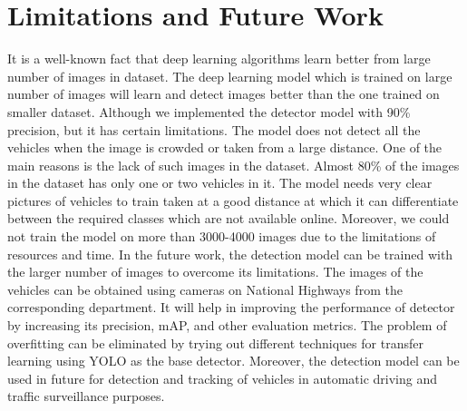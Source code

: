 \section{Limitations and Future Work}
It is a well-known fact that deep learning algorithms learn better from large number of images in dataset. The deep learning model which is trained on large number of images will learn and detect images better than the one trained on smaller dataset. Although we implemented the detector model with 90\% precision, but it has certain limitations. The model does not detect all the vehicles when the image is crowded or taken from a large distance. One of the main reasons is the lack of such images in the dataset. Almost 80\% of the images in the dataset has only one or two vehicles in it. The model needs very clear pictures of vehicles to train taken at a good distance at which it can differentiate between the required classes which are not available online. Moreover, we could not train the model on more than 3000-4000 images due to the limitations of resources and time. 
\noindent
In the future work, the detection model can be trained with the larger number of images to overcome its limitations. The images of the vehicles can be obtained using cameras on National Highways from the corresponding department. It will help in improving the performance of detector by increasing its precision, mAP, and other evaluation metrics. The problem of overfitting can be eliminated by trying out different techniques for transfer learning using YOLO as the base detector. Moreover, the detection model can be used in future for detection and tracking of vehicles in automatic driving and traffic surveillance purposes.
